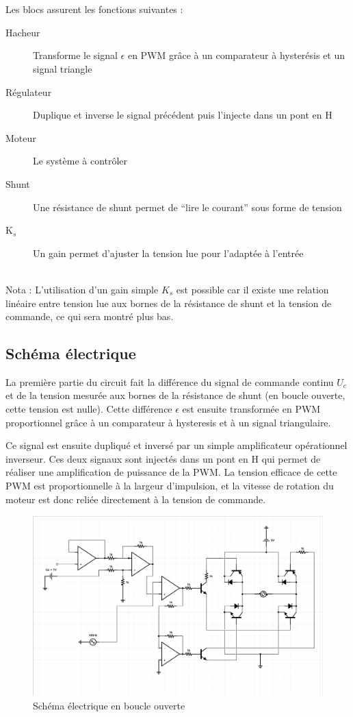 \documentclass[a4paper]{article}
\begin{document}
\hfill \\\\
Les blocs assurent les fonctions suivantes :
\begin{description}
  \item[Hacheur] 	Transforme le signal $\epsilon$ en PWM grâce à un comparateur à hysterésis et un signal triangle
  \item[Régulateur] Duplique et inverse le signal précédent puis l'injecte dans un pont en H
  \item[Moteur] 	Le système à contrôler
  \item[Shunt] 		Une résistance de shunt permet de “lire le courant” sous forme de tension
  \item[K$_{s}$]	Un gain permet d'ajuster la tension lue pour l'adaptée à l'entrée 
\end{description}

\hfill \\
Nota : L'utilisation d'un gain simple $K_{s}$ est possible car il existe une relation linéaire entre tension lue aux bornes de la résistance de shunt et la tension de commande, ce qui sera montré plus bas.

\subsection{Schéma électrique}

La première partie du circuit fait la différence du signal de commande continu $U_{c}$ et de la tension mesurée aux bornes de la résistance de shunt (en boucle ouverte, cette tension est nulle). Cette différence $\epsilon$ est ensuite transformée en PWM proportionnel grâce à un comparateur à hysteresis et à un signal triangulaire.

Ce signal est ensuite dupliqué et inversé par un simple amplificateur opérationnel inverseur. Ces deux signaux sont injectés dans un pont en H qui permet de réaliser une amplification de puissance de la PWM. La tension efficace de cette PWM est proportionnelle à la largeur d'impulsion, et la vitesse de rotation du moteur est donc reliée directement à la tension de commande.

\begin{figure}[H]
\centering
	\includegraphics[width=1\textwidth]{schema.png}
	\caption{Schéma électrique en boucle ouverte}
\end{figure}
\end{document}
